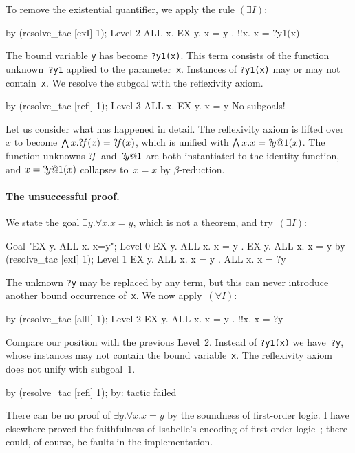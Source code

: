 To remove the existential quantifier, we apply the rule $(\exists I)$:
\begin{ttbox}
by (resolve_tac [exI] 1);
{\out Level 2}
{\out ALL x. EX y. x = y}
{. !!x. x = ?y1(x)}
\end{ttbox}
The bound variable \texttt{y} has become {\tt?y1(x)}.  This term consists of
the function unknown~{\tt?y1} applied to the parameter~\texttt{x}.
Instances of {\tt?y1(x)} may or may not contain~\texttt{x}.  We resolve the
subgoal with the reflexivity axiom.
\begin{ttbox}
by (resolve_tac [refl] 1);
{\out Level 3}
{\out ALL x. EX y. x = y}
{\out No subgoals!}
\end{ttbox}
Let us consider what has happened in detail.  The reflexivity axiom is
lifted over~$x$ to become $\bigwedge x.{?\!f}(x)={?\!f}(x)$, which is
unified with $\bigwedge x.x={?\!y@1}(x)$.  The function unknowns ${?\!f}$
and~${?\!y@1}$ are both instantiated to the identity function, and
$x={?\!y@1}(x)$ collapses to~$x=x$ by $\beta$-reduction.

\paragraph{The unsuccessful proof.}
We state the goal $\exists y.\forall x.x=y$, which is not a theorem, and
try~$(\exists I)$:
\begin{ttbox}
Goal "EX y. ALL x. x=y";
{\out Level 0}
{\out EX y. ALL x. x = y}
{. EX y. ALL x. x = y}
\ttbreak
by (resolve_tac [exI] 1);
{\out Level 1}
{\out EX y. ALL x. x = y}
{. ALL x. x = ?y}
\end{ttbox}
The unknown \texttt{?y} may be replaced by any term, but this can never
introduce another bound occurrence of~\texttt{x}.  We now apply~$(\forall I)$:
\begin{ttbox}
by (resolve_tac [allI] 1);
{\out Level 2}
{\out EX y. ALL x. x = y}
{. !!x. x = ?y}
\end{ttbox}
Compare our position with the previous Level~2.  Instead of {\tt?y1(x)} we
have~{\tt?y}, whose instances may not contain the bound variable~\texttt{x}.
The reflexivity axiom does not unify with subgoal~1.
\begin{ttbox}
by (resolve_tac [refl] 1);
{\out by: tactic failed}
\end{ttbox}
There can be no proof of $\exists y.\forall x.x=y$ by the soundness of
first-order logic.  I have elsewhere proved the faithfulness of Isabelle's
encoding of first-order logic~\cite{paulson-found}; there could, of course, be
faults in the implementation.


